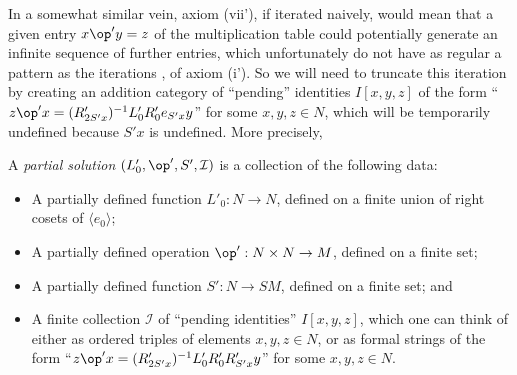 In a somewhat similar vein, axiom (vii'), if iterated naively, would mean that a given entry $x \op' y = z$ of the multiplication table could potentially generate an infinite sequence of further entries, which unfortunately do not have as regular a pattern as the iterations ,  of axiom (i').  So we will need to truncate this iteration by creating an addition category of ``pending'' identities $I[x,y,z]$ of the form ``$z \op' x = (R'_{2S'x})^{-1} L'_0 R'_0 e_{S'x} y$'' for some $x,y,z \in N$, which will be temporarily undefined because $S'x$ is undefined. More precisely,

\begin{definition}\label{part-sol}\leanok  A \emph{partial solution} $(L'_0, \op', S', {\mathcal I})$ is a collection of the following data:
\begin{itemize}
  \item A partially defined function $L'_0: N \to N$, defined on a finite union of right cosets of $\langle e_0\rangle$;
  \item A partially defined operation $\op': N \times N \to M$, defined on a finite set;
  \item A partially defined function $S': N \to SM$, defined on a finite set; and
  \item A finite collection ${\mathcal  I}$ of ``pending identities'' $I[x,y,z]$, which one can think of either as ordered triples of elements $x,y,z \in N$, or as formal strings of the form ``$z \op' x = (R'_{2S'x})^{-1} L'_0 R'_0 R'_{S'x} y$'' for some $x,y,z \in N$.
\end{itemize}


\end{definition}
